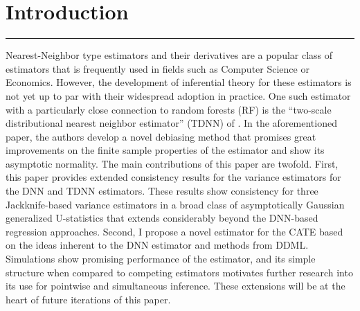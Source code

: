 \section{Introduction}
\hrule
Nearest-Neighbor type estimators and their derivatives are a popular class of estimators that is frequently used in fields such as Computer Science or Economics.
However, the development of inferential theory for these estimators is not yet up to par with their widespread adoption in practice.
One such estimator with a particularly close connection to random forests (RF) is the ``two-scale distributional nearest neighbor estimator'' (TDNN) of \citet{demirkaya_optimal_2024}.
In the aforementioned paper, the authors develop a novel debiasing method that promises great improvements on the finite sample properties of the estimator and show its asymptotic normality.
The main contributions of this paper are twofold.
First, this paper provides extended consistency results for the variance estimators for the DNN and TDNN estimators.
These results show consistency for three Jackknife-based variance estimators in a broad class of asymptotically Gaussian generalized U-statistics that extends considerably beyond the DNN-based regression approaches.
Second, I propose a novel estimator for the CATE based on the ideas inherent to the DNN estimator and methods from DDML.
Simulations show promising performance of the estimator, and its simple structure when compared to competing estimators motivates further research into its use for pointwise and simultaneous inference.
These extensions will be at the heart of future iterations of this paper.

